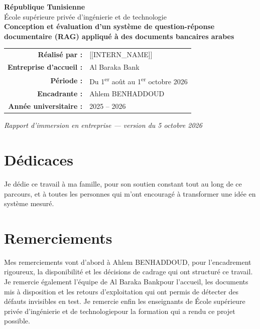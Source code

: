 \documentclass[a4paper,12pt]{report}
\newcommand{\EtudiantNom}{[[INTERN_NAME]]}
\newcommand{\EcoleNom}{École supérieure privée d'ingénierie et de technologie}
\newcommand{\EntrepriseNom}{Al Baraka Bank}
\newcommand{\EncadrantNom}{Ahlem BENHADDOUD}
\newcommand{\StagePeriode}{Du 1\textsuperscript{er} août au 1\textsuperscript{er} octobre 2026}
\newcommand{\AnneeUniv}{2025 -- 2026}
\newcommand{\SujetStage}{Conception et évaluation d'un système de question-réponse
documentaire (RAG) appliqué à des documents bancaires arabes}
\begin{document}
\begin{titlepage}
\centering
\vspace*{0.6cm}
{\large \textbf{République Tunisienne}}\\[0.2cm]
{\normalsize \EcoleNom}\\[0.9cm]
{\large \textbf{\SujetStage}}\\[1.1cm]

\begin{tabular}{rl}
\textbf{Réalisé par :} & \EtudiantNom \\[0.15cm]
\textbf{Entreprise d'accueil :} & \EntrepriseNom \\[0.15cm]
\textbf{Période :} & \StagePeriode \\[0.15cm]
\textbf{Encadrante :} & \EncadrantNom \\[0.15cm]
\textbf{Année universitaire :} & \AnneeUniv \\
\end{tabular}

\vfill
{\small \textit{Rapport d'immersion en entreprise — version du 5 octobre 2026}}
\end{titlepage}

\chapter*{Dédicaces}
Je dédie ce travail à ma famille, pour son soutien constant tout au long de ce parcours,
et à toutes les personnes qui m'ont encouragé à transformer une idée en système mesuré.

\chapter*{Remerciements}
Mes remerciements vont d'abord à \EncadrantNom, pour l'encadrement rigoureux, la disponibilité
et les décisions de cadrage qui ont structuré ce travail. Je remercie également l'équipe de
\EntrepriseNom pour l'accueil, les documents mis à disposition et les retours d'exploitation
qui ont permis de détecter des défauts invisibles en test. Je remercie enfin les enseignants de
\EcoleNom pour la formation qui a rendu ce projet possible.
\end{document}
